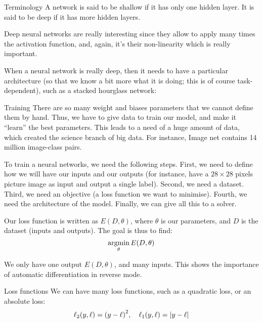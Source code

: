 \documentclass[a4paper]{article}
\begin{document}
\begin{parag}{Terminology}
    A network is said to be shallow if it has only one hidden layer. It is said to be deep if it has more hidden layers. 

    Deep neural networks are really interesting since they allow to apply many times the activation function, and, again, it's their non-linearity which is really important.

    When a neural network is really deep, then it needs to have a particular architecture (so that we know a bit more what it is doing; this is of course task-dependent), such as a stacked hourglass network:
\end{parag}

\begin{parag}{Training}
    There are so many weight and biases parameters that we cannot define them by hand. Thus, we have to give data to train our model, and make it ``learn'' the best parameters. This leads to a need of a huge amount of data, which created the science branch of big data. For instance, Image net contains 14 million image-class pairs.

    To train a neural networks, we need the following steps. First, we need to define how we will have our inputs and our outputs (for instance, have a $28\times28$ pixels picture image as input and output a single label). Second, we need a dataset. Third, we need an objective (a loss function we want to minimise). Fourth, we need the architecture of the model. Finally, we can give all this to a solver.

    Our loss function is written as $E\left(D, \theta\right)$, where $\theta$ is our parameters, and $D$ is the dataset (inputs and outputs). The goal is thus to find: 
    \[\argmin_{\theta} E\left(D, \theta\right)\]

    We only have one output $E\left(D, \theta\right)$, and many inputs. This shows the importance of automatic differentiation in reverse mode.

    \begin{subparag}{Loss functions}
        We can have many loss functions, such as a quadratic loss, or an absolute loss: 
        \[\ell_2\left(y, \ell \right) = \left(y - \ell \right)^2, \mathspace \ell _1\left(y, \ell \right) = \left|y - \ell \right|\]

    \end{subparag}
\end{parag}
\end{document}
